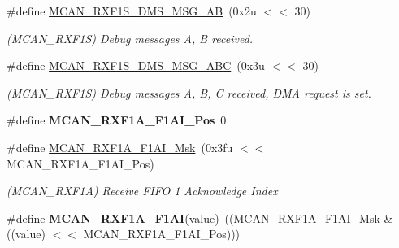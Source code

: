 \begin{DoxyCompactItemize}
\mbox{\label{group__SAME70__MCAN_gacbf7bee01d40302a1d0caa4b2f5a60e8}} 
\#define \mbox{\hyperlink{group__SAME70__MCAN_gacbf7bee01d40302a1d0caa4b2f5a60e8}{M\+C\+A\+N\+\_\+\+R\+X\+F1\+S\+\_\+\+D\+M\+S\+\_\+\+M\+S\+G\+\_\+\+AB}}~(0x2u $<$$<$ 30)
\begin{DoxyCompactList}\small\item\em (M\+C\+A\+N\+\_\+\+R\+X\+F1S) Debug messages A, B received. \end{DoxyCompactList}\item 
\mbox{\label{group__SAME70__MCAN_ga8fa7bd9d8b9ddc8a7755594222a11285}} 
\#define \mbox{\hyperlink{group__SAME70__MCAN_ga8fa7bd9d8b9ddc8a7755594222a11285}{M\+C\+A\+N\+\_\+\+R\+X\+F1\+S\+\_\+\+D\+M\+S\+\_\+\+M\+S\+G\+\_\+\+A\+BC}}~(0x3u $<$$<$ 30)
\begin{DoxyCompactList}\small\item\em (M\+C\+A\+N\+\_\+\+R\+X\+F1S) Debug messages A, B, C received, D\+MA request is set. \end{DoxyCompactList}\item 
\mbox{\label{group__SAME70__MCAN_ga61710968ae15efe1c6879a17b903d2d3}} 
\#define {\bfseries M\+C\+A\+N\+\_\+\+R\+X\+F1\+A\+\_\+\+F1\+A\+I\+\_\+\+Pos}~0
\item 
\mbox{\label{group__SAME70__MCAN_ga411a42b24a0a1d627c19d184d1dad935}} 
\#define \mbox{\hyperlink{group__SAME70__MCAN_ga411a42b24a0a1d627c19d184d1dad935}{M\+C\+A\+N\+\_\+\+R\+X\+F1\+A\+\_\+\+F1\+A\+I\+\_\+\+Msk}}~(0x3fu $<$$<$ M\+C\+A\+N\+\_\+\+R\+X\+F1\+A\+\_\+\+F1\+A\+I\+\_\+\+Pos)
\begin{DoxyCompactList}\small\item\em (M\+C\+A\+N\+\_\+\+R\+X\+F1A) Receive F\+I\+FO 1 Acknowledge Index \end{DoxyCompactList}\item 
\mbox{\label{group__SAME70__MCAN_gacff45ce868416856f423942f8608650b}} 
\#define {\bfseries M\+C\+A\+N\+\_\+\+R\+X\+F1\+A\+\_\+\+F1\+AI}(value)~((\mbox{\hyperlink{group__SAMV71__MCAN_ga411a42b24a0a1d627c19d184d1dad935}{M\+C\+A\+N\+\_\+\+R\+X\+F1\+A\+\_\+\+F1\+A\+I\+\_\+\+Msk}} \& ((value) $<$$<$ M\+C\+A\+N\+\_\+\+R\+X\+F1\+A\+\_\+\+F1\+A\+I\+\_\+\+Pos)))
\item 

\end{DoxyCompactItemize}
